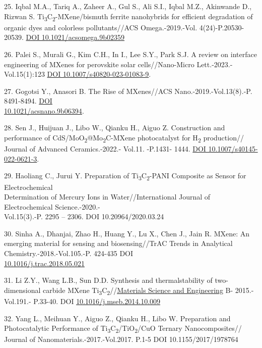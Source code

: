 \begin{references}
25. Iqbal M.A., Tariq A., Zaheer A., Gul S., Ali S.I., Iqbal
M.Z., Akinwande D., Rizwan S.
Ti\textsubscript{3}C\textsubscript{2}-MXene/bismuth ferrite
nanohybrids for efficient degradation of organic dyes and
colorless pollutants//ACS Omega.-2019.-Vol. 4(24)-P.20530-20539.
\href{https://doi.org/10.1021/acsomega.9b02359}{DOI
10.1021/acsomega.9b02359}

26. Palei S., Murali G., Kim C.H., In I., Lee S.Y., Park S.J. A
review on interface engineering of MXenes for perovskite solar
cells//Nano-Micro Lett.-2023.-Vol.15(1):123
\href{https://doi.org/10.1007/s40820-023-01083-9}{DOI
10.1007/s40820-023-01083-9}.

27. Gogotsi Y., Anasori B. The Rise of MXenes//ACS
Nano.-2019.-Vol.13(8).-P. 8491-8494.
\href{https://doi.org/10.1021/acsnano.9b06394}{DOI\\
10.1021/acsnano.9b06394}.

28. Sen J., Huijuan J., Libo W., Qianku H., Aiguo Z. Construction
and performance of
CdS/MoO\textsubscript{2}@Mo\textsubscript{2}C-MXene photocatalyst
for H\textsubscript{2} production// Journal of Advanced
Ceramics.-2022.- Vol.11. -P.1431- 1444.
\href{https://doi.org/10.1007/s40145-022-0621-3}{DOI
10.1007/s40145-022-0621-3}.

29. Haoliang C., Jurui Y. Preparation of
Ti\textsubscript{3}C\textsubscript{2}-PANI Composite as Sensor for
Electrochemical \\Determination of Mercury Ions in
Water//International Journal of Electrochemical Science.-2020.-\\
Vol.15(3).-P. 2295 -- 2306. DOI 10.20964/2020.03.24

30. Sinha A., Dhanjai, Zhao H., Huang Y., Lu X., Chen J., Jain R.
MXene: An emerging material for sensing and biosensing//TrAC
Trends in Analytical Chemistry.-2018.-Vol.105.-P. 424-435 DOI\\
\href{http://dx.doi.org/10.1016/j.trac.2018.05.021}{10.1016/j.trac.2018.05.021}

31. Li Z.Y., Wang L.B., Sun D.D. Synthesis and thermalstability
of two-dimensional carbide MXene
Ti\textsubscript{3}C\textsubscript{2}//\href{https://www.researchgate.net/journal/Materials-Science-and-Engineering-B-0921-5107?_tp=eyJjb250ZXh0Ijp7ImZpcnN0UGFnZSI6InB1YmxpY2F0aW9uIiwicGFnZSI6InB1YmxpY2F0aW9uIn19}{Materials
Science and Engineering} B- 2015.-Vol.191.- P.33-40.
DOI \href{http://dx.doi.org/10.1016/j.mseb.2014.10.009}{10.1016/j.mseb.2014.10.009}

32. Yang L., Meihuan Y., Aiguo Z., Qianku H., Libo W.
Preparation and Photocatalytic Performance of
Ti\textsubscript{3}C\textsubscript{2}/TiO\textsubscript{2}/CuO
Ternary Nanocomposites// Journal of Nanomaterials.-2017.-Vol.2017.
P.1-5 DOI 10.1155/2017/1978764
\end{references}

